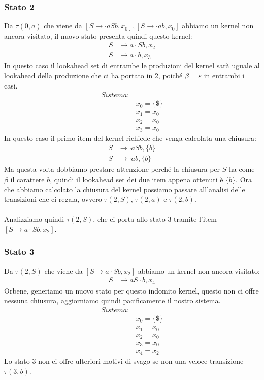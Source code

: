 \documentclass[class=book, crop=false, oneside, 12pt]{standalone}
\begin{document}
\subsubsection*{Stato 2}
Da \(\tau(0, a)\) che viene da \([S \to \cdot aSb, x_0], [S \to \cdot ab, x_0]\) abbiamo un kernel non ancora visitato, il nuovo stato presenta quindi questo kernel:
\begin{align*}
    S &\to  a \cdot S b, x_2 \\
    S &\to  a \cdot b, x_3
\end{align*}
In questo caso il lookahead set di entrambe le produzioni del kernel sarà uguale al lookahead della produzione che ci ha portato in 2, poiché \(\beta = \varepsilon\) in entrambi i casi.
\begin{align*}
    Sistema:& \\
            & x_0 = \{\$\}\\
            & x_1 = x_0 \\
            & x_2 = x_0 \\
            & x_3 = x_0
\end{align*}
In questo caso il primo item del kernel richiede che venga calcolata una chiusura:
\begin{align*}
    S &\to  \cdot a S b, \{b\} \\
    S &\to  \cdot a b, \{b\}
\end{align*}
Ma questa volta dobbiamo prestare attenzione perché la chiusura per \(S\) ha come \(\beta\) il carattere \(b\), quindi il lookahead set dei due item appena  ottenuti è \(\{b\}\).
Ora che abbiamo calcolato la chiusura del kernel possiamo passare all'analisi delle transizioni che ci regala, ovvero \(\tau(2, S)\), \(\tau(2, a)\) e \(\tau(2, b)\).
\\\\
Analizziamo quindi \(\tau(2,S)\), che ci porta allo stato 3 tramite l'item \([S \to a \cdot S b, x_2]\).
\subsubsection*{Stato 3}
Da \(\tau(2, S)\) che viene da \([S \to a \cdot Sb, x_2]\) abbiamo un kernel non ancora visitato:
\begin{align*}
    S &\to  a S \cdot b, x_4
\end{align*}
Orbene, generiamo un nuovo stato per questo indomito kernel, questo non ci offre nessuna chiusura, aggiorniamo quindi pacificamente il nostro sistema.
\begin{align*}
    Sistema:& \\
            & x_0 = \{\$\}\\
            & x_1 = x_0 \\
            & x_2 = x_0 \\
            & x_3 = x_0 \\
            & x_4 = x_2
\end{align*}
Lo stato 3 non ci offre ulteriori motivi di svago se non una veloce transizione \(\tau(3,b)\).
\end{document}
